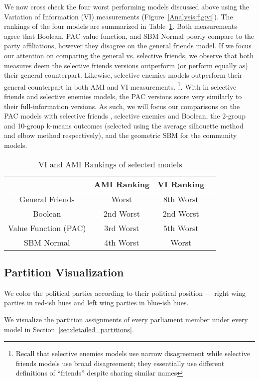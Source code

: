 We now cross check the four worst performing models discussed above using the
Variation of Information (VI) measurements (Figure~\ref{Analysis:fig:vi}).
The rankings of the four models are summarized in
Table~\ref{Analysis:table:ami_vi_worst_rankings}.
Both measurements agree that Boolean, PAC value function, and SBM Normal poorly
compare to the party affiliations, however they disagree on the general friends
model.
If we focus our attention on comparing the general vs. selective friends, we
observe that both measures deem the selective friends versions outperform
(or perform equally as) their general counterpart.
Likewise, selective enemies models outperform their general counterpart in
both AMI and VI measurements. \footnote{Recall that selective enemies models
use narrow disagreement while selective friends models use broad disagreement;
they essentially use different definitions of ``friends'' despite sharing
similar names}.
With in selective friends and selective enemies models, the PAC versions
score very similarly to their full-information versions.
As such, we will focus our comparisons on the PAC models with selective friends
, selective enemies and Boolean, the 2-group and 10-group k-means outcomes
(selected using the average silhouette method and elbow method respectively),
and the geometric SBM for the community models.

\begin{table}[h!]
\centering
\begin{tabular}{|c|c|c|c|}
\hline
       & AMI Ranking & VI Ranking \\ \hline
General Friends & Worst & 8th Worst \\
Boolean & 2nd Worst & 2nd Worst \\
Value Function (PAC) & 3rd Worst & 5th Worst \\
SBM Normal & 4th Worst & Worst \\
\hline
\end{tabular}
\caption{VI and AMI Rankings of selected models}
\label{Analysis:table:ami_vi_worst_rankings}
\end{table}

\subsection{Partition Visualization}
\label{subsec:partition_visualization}

We color the political parties according to their political position --- 
right wing parties in red-ish hues and left wing parties in blue-ish hues.


We visualize the partition assignments of every parliament member under every model
in Section~\ref{sec:detailed_partitions}.
